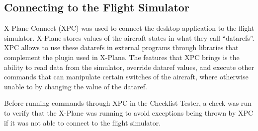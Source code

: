 \documentclass[../dissertation.tex]{subfiles}
\begin{document}
\subsection{Connecting to the Flight Simulator}

X-Plane Connect (XPC) was used to connect the desktop application to the flight simulator.
X-Plane stores values of the aircraft states in what they call \enquote{datarefs}.
XPC allows to use these datarefs in external programs through libraries that complement the
plugin used in X-Plane. The features that XPC brings is the ability to read data from the
simulator, override dataref values, and execute other commands that can manipulate
certain switches of the aircraft, where otherwise unable to by changing the value of the
dataref.

Before running commands through XPC in the Checklist Tester, a check was run to verify
that the X-Plane was running to avoid exceptions being thrown by XPC if it was not able
to connect to the flight simulator.
\end{document}
